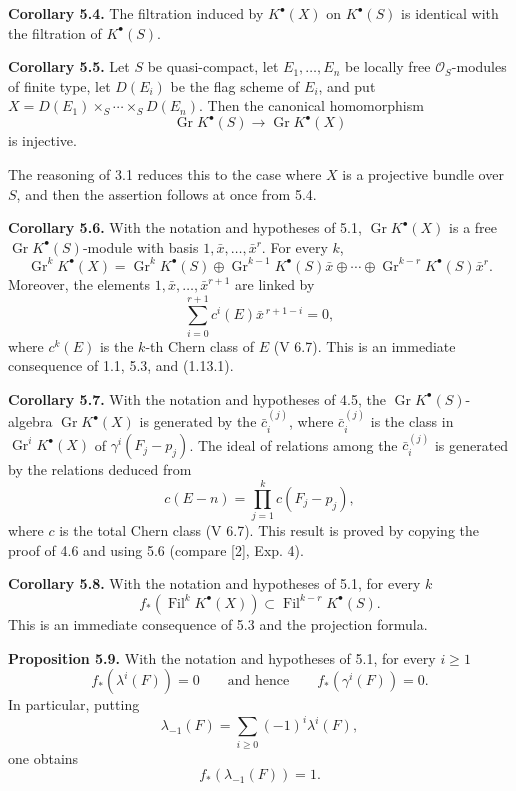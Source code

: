 \documentclass[11pt]{article}
\newcommand{\Fil}{\operatorname{Fil}}
\begin{document}
\textbf{Corollary 5.4.} The filtration induced by \(K^\bullet(X)\) on \(K^\bullet(S)\) is identical with the filtration of \(K^\bullet(S)\).

\textbf{Corollary 5.5.} Let \(S\) be quasi-compact, let \(E_1,\ldots,E_n\) be locally free \(\mathcal O_S\)-modules of finite type, let \(D(E_i)\) be the flag scheme of \(E_i\), and put \(X=D(E_1)\times_S\cdots\times_S D(E_n)\). Then the canonical homomorphism
\[
  \operatorname{Gr}K^\bullet(S)\longrightarrow \operatorname{Gr}K^\bullet(X)
\]
is injective.

The reasoning of 3.1 reduces this to the case where \(X\) is a projective bundle over \(S\), and then the assertion follows at once from 5.4.

\textbf{Corollary 5.6.} With the notation and hypotheses of 5.1, \(\operatorname{Gr}K^\bullet(X)\) is a free \(\operatorname{Gr}K^\bullet(S)\)-module with basis \(1,\bar x,\ldots,\bar x^r\). For every \(k\),
\[
  \operatorname{Gr}^kK^\bullet(X)=
  \operatorname{Gr}^kK^\bullet(S)\oplus
  \operatorname{Gr}^{k-1}K^\bullet(S)\bar x\oplus\cdots\oplus
  \operatorname{Gr}^{k-r}K^\bullet(S)\bar x^r.
\]
Moreover, the elements \(1,\bar x,\ldots,\bar x^{r+1}\) are linked by
\[
  \sum_{i=0}^{r+1}c^i(E)\bar x^{\,r+1-i}=0,
\]
where \(c^k(E)\) is the \(k\)-th Chern class of \(E\) (V 6.7). This is an immediate consequence of 1.1, 5.3, and (1.13.1).

\textbf{Corollary 5.7.} With the notation and hypotheses of 4.5, the \(\operatorname{Gr}K^\bullet(S)\)-algebra \(\operatorname{Gr}K^\bullet(X)\) is generated by the \(\bar c_i^{(j)}\), where \(\bar c_i^{(j)}\) is the class in \(\operatorname{Gr}^iK^\bullet(X)\) of \(\gamma^i(F_j-p_j)\). The ideal of relations among the \(\bar c_i^{(j)}\) is generated by the relations deduced from
\[
  c(E-n)=\prod_{j=1}^{k}c(F_j-p_j),
\]
where \(c\) is the total Chern class (V 6.7). This result is proved by copying the proof of 4.6 and using 5.6 (compare [2], Exp. 4).

\textbf{Corollary 5.8.} With the notation and hypotheses of 5.1, for every \(k\)
\[
  f_*(\Fil^kK^\bullet(X))\subset \Fil^{k-r}K^\bullet(S).
\]
This is an immediate consequence of 5.3 and the projection formula.

\textbf{Proposition 5.9.} With the notation and hypotheses of 5.1, for every \(i\geq1\)
\[
  f_*(\lambda^i(F))=0
  \qquad\text{and hence}\qquad
  f_*(\gamma^i(F))=0.
\]
In particular, putting
\[
  \lambda_{-1}(F)=\sum_{i\geq0}(-1)^i\lambda^i(F),
\]
one obtains
\[
  f_*(\lambda_{-1}(F))=1.
\]
\end{document}
